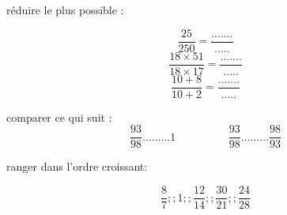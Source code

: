 \documentclass[a4paper,addpoints,12pt]{exam}
\begin{document}
\begin{exo}
\begin{questions}
		\question[2] réduire le plus possible :
		
		\[\dfrac{25}{250}=\dfrac{.......}{.....}\]
\[\dfrac{18\times 51}{18 \times 17}=\dfrac{.......}{.....}\]
\[\dfrac{10+8}{10+2}=\dfrac{.......}{.....}\]
		
	\end{questions}
\end{exo}

\begin{exo}
\begin{questions}
		\question[2] comparer ce qui suit  :	
$$\dfrac{93}{98}......... 1 \hspace{1cm}   \hspace{1cm}
\dfrac{93}{98}.........\dfrac{98}{93}$$

\question[1] ranger dans l'ordre croissant:

$$\dfrac{8}{7} ;; 1 ;; \dfrac{12}{14} ;; \dfrac{30}{21}  ;; \dfrac{24}{28}$$	

\end{questions}
\end{exo}
\end{document}
